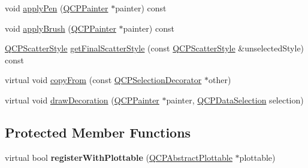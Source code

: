 \begin{DoxyCompactItemize}
void \mbox{\hyperlink{class_q_c_p_selection_decorator_a75098893f7d08660ea449206810679d7}{apply\+Pen}} (\mbox{\hyperlink{class_q_c_p_painter}{Q\+C\+P\+Painter}} $\ast$painter) const
\item 
void \mbox{\hyperlink{class_q_c_p_selection_decorator_a225544527d51b49546b70d0e6d655a34}{apply\+Brush}} (\mbox{\hyperlink{class_q_c_p_painter}{Q\+C\+P\+Painter}} $\ast$painter) const
\item 
\mbox{\hyperlink{class_q_c_p_scatter_style}{Q\+C\+P\+Scatter\+Style}} \mbox{\hyperlink{class_q_c_p_selection_decorator_a1277b373248896bc70e8cc1de96da9fa}{get\+Final\+Scatter\+Style}} (const \mbox{\hyperlink{class_q_c_p_scatter_style}{Q\+C\+P\+Scatter\+Style}} \&unselected\+Style) const
\item 
virtual void \mbox{\hyperlink{class_q_c_p_selection_decorator_a467a8d5cfcab27e862a17c797ac27b8a}{copy\+From}} (const \mbox{\hyperlink{class_q_c_p_selection_decorator}{Q\+C\+P\+Selection\+Decorator}} $\ast$other)
\item 
virtual void \mbox{\hyperlink{class_q_c_p_selection_decorator_a4f8eb49e277063845391e803ae23054a}{draw\+Decoration}} (\mbox{\hyperlink{class_q_c_p_painter}{Q\+C\+P\+Painter}} $\ast$painter, \mbox{\hyperlink{class_q_c_p_data_selection}{Q\+C\+P\+Data\+Selection}} selection)
\end{DoxyCompactItemize}
\subsection*{Protected Member Functions}
\begin{DoxyCompactItemize}
\item 
\mbox{\label{class_q_c_p_selection_decorator_af66cb39e308da0285ae5d533e1e85027}} 
virtual bool {\bfseries register\+With\+Plottable} (\mbox{\hyperlink{class_q_c_p_abstract_plottable}{Q\+C\+P\+Abstract\+Plottable}} $\ast$plottable)
\end{DoxyCompactItemize}
